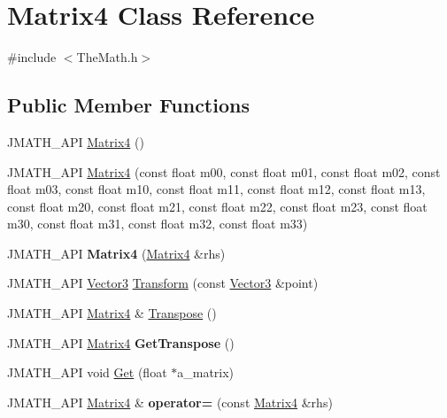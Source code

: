 \hypertarget{class_matrix4}{\section{Matrix4 Class Reference}
\label{class_matrix4}
}


{\ttfamily \#include $<$The\+Math.\+h$>$}

\subsection*{Public Member Functions}
\begin{DoxyCompactItemize}
\item 
J\+M\+A\+T\+H\+\_\+\+A\+P\+I \hyperlink{class_matrix4_a21e70a74447b9b05cf9a06400bc9c661}{Matrix4} ()
\item 
J\+M\+A\+T\+H\+\_\+\+A\+P\+I \hyperlink{class_matrix4_a0b41d57d611c71ee652cfed764f6a6fc}{Matrix4} (const float m00, const float m01, const float m02, const float m03, const float m10, const float m11, const float m12, const float m13, const float m20, const float m21, const float m22, const float m23, const float m30, const float m31, const float m32, const float m33)
\item 
\hypertarget{class_matrix4_aa1f48a925e87cf1d0d0910576d300dad}{J\+M\+A\+T\+H\+\_\+\+A\+P\+I {\bfseries Matrix4} (\hyperlink{class_matrix4}{Matrix4} \&rhs)}\label{class_matrix4_aa1f48a925e87cf1d0d0910576d300dad}

\item 
J\+M\+A\+T\+H\+\_\+\+A\+P\+I \hyperlink{class_vector3}{Vector3} \hyperlink{class_matrix4_afe1011dd686fe835aef45cb96de5d094}{Transform} (const \hyperlink{class_vector3}{Vector3} \&point)
\item 
J\+M\+A\+T\+H\+\_\+\+A\+P\+I \hyperlink{class_matrix4}{Matrix4} \& \hyperlink{class_matrix4_aad6cd9183ad404a67503e177ddeeec4c}{Transpose} ()
\item 
\hypertarget{class_matrix4_a95bfb6b6733d5b40b59769cdaac06bc4}{J\+M\+A\+T\+H\+\_\+\+A\+P\+I \hyperlink{class_matrix4}{Matrix4} {\bfseries Get\+Transpose} ()}\label{class_matrix4_a95bfb6b6733d5b40b59769cdaac06bc4}

\item 
J\+M\+A\+T\+H\+\_\+\+A\+P\+I void \hyperlink{class_matrix4_a0689e86d13cd1aaa8ed24ccc1c4dbac2}{Get} (float $\ast$a\+\_\+matrix)
\item 
\hypertarget{class_matrix4_a54c8ea41ae842f54d43ea50a7c13627b}{J\+M\+A\+T\+H\+\_\+\+A\+P\+I \hyperlink{class_matrix4}{Matrix4} \& {\bfseries operator=} (const \hyperlink{class_matrix4}{Matrix4} \&rhs)}\label{class_matrix4_a54c8ea41ae842f54d43ea50a7c13627b}


\end{DoxyCompactItemize}
